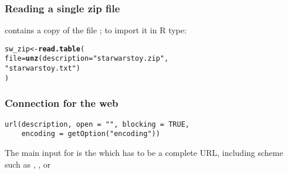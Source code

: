 \documentclass[12pt]{beamer}\usepackage[]{graphicx}\usepackage[]{color}
\makeatletter
\newcommand{\hlstr}[1]{\textcolor[rgb]{0.192,0.494,0.8}{#1}}%
\newcommand{\hlstd}[1]{\textcolor[rgb]{0.345,0.345,0.345}{#1}}%
\newcommand{\hlkwb}[1]{\textcolor[rgb]{0.69,0.353,0.396}{#1}}%
\newcommand{\hlkwc}[1]{\textcolor[rgb]{0.333,0.667,0.333}{#1}}%
\newcommand{\hlkwd}[1]{\textcolor[rgb]{0.737,0.353,0.396}{\textbf{#1}}}%
\newenvironment{kframe}{%
 \def\at@end@of@kframe{}%
 \ifinner\ifhmode%
  \def\at@end@of@kframe{\end{minipage}}%
  \begin{minipage}{\columnwidth}%
 \fi\fi%
 \def\FrameCommand##1{\hskip\@totalleftmargin \hskip-\fboxsep
 \colorbox{shadecolor}{##1}\hskip-\fboxsep
     \hskip-\linewidth \hskip-\@totalleftmargin \hskip\columnwidth}%
 \MakeFramed {\advance\hsize-\width
   \@totalleftmargin\z@ \linewidth\hsize
   \@setminipage}}%
 {\par\unskip\endMakeFramed%
 \at@end@of@kframe}
\newenvironment{knitrout}{}{} %
\makeatother
\begin{document}

\begin{frame}[fragile]
\frametitle{Reading a single zip file}

 contains a copy of the file ; to import it in R type:
\begin{knitrout}\footnotesize
{}\color{fgcolor}\begin{kframe}
\begin{alltt}
\hlstd{sw_zip} \hlkwb{<-} \hlkwd{read.table}\hlstd{(}
  \hlkwc{file} \hlstd{=} \hlkwd{unz}\hlstd{(}\hlkwc{description} \hlstd{=} \hlstr{"starwarstoy.zip"}\hlstd{,}
             \hlstr{"starwarstoy.txt"}\hlstd{)}
\hlstd{)}
\end{alltt}
\end{kframe}
\end{knitrout}

\end{frame}


\begin{frame}[fragile]
\frametitle{Connection for the web}

 \begin{verbatim}
url(description, open = "", blocking = TRUE,
    encoding = getOption("encoding"))
 \end{verbatim}
\eb

The main input for  is the  which has to be a complete URL, including scheme such as , , or 

\end{frame}

\end{document}
